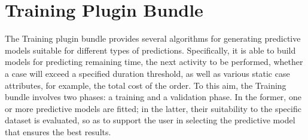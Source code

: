 \documentclass[runningheads,a4paper]{llncs}
\begin{document}
\section{Training Plugin Bundle} \label{sec:training}
The Training plugin bundle provides several algorithms for generating predictive models suitable for different types of predictions. Specifically, it is able to build models for predicting remaining time, the next activity to be performed, whether a case will exceed a specified duration threshold, as well as various static case attributes, for example, the total cost of the order.
%
To this aim, the Training bundle involves two phases: a training and a validation phase. In the former, one or more predictive models are fitted; in the latter, their suitability to the specific dataset is evaluated, so as to support the user in selecting the predictive model that ensures the best results.
\end{document}
